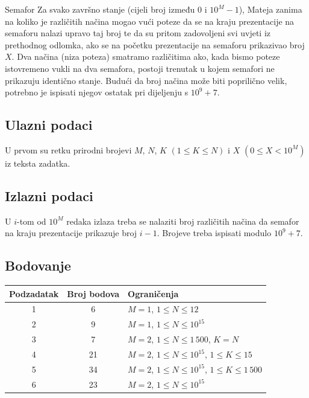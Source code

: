 \begin{statement}[
  problempoints=100,
  timelimit=1 sekunda,
  memorylimit=512 MiB,
]{Semafor}
Za svako završno stanje (cijeli broj između $0$ i $10^M-1$), Mateja zanima na
koliko je različitih načina mogao vući poteze da se na kraju prezentacije na
semaforu nalazi upravo taj broj te da su pritom zadovoljeni svi uvjeti iz
prethodnog odlomka, ako se na početku prezentacije na semaforu prikazivao
broj $X$. Dva načina (niza poteza) smatramo različitima ako, kada bismo
poteze istovremeno vukli na dva semafora, postoji trenutak u kojem semafori
ne prikazuju identično stanje. Budući da broj načina može biti poprilično
velik, potrebno je ispisati njegov ostatak pri dijeljenju s $10^9+7$.
\subsection*{Ulazni podaci}
U prvom su retku prirodni brojevi $M$, $N$, $K$ $(1 \le K \le N)$ i $X$ $(0
\le X < 10^M)$ iz teksta zadatka.

\subsection*{Izlazni podaci}
U $i$-tom od $10^M$ redaka izlaza treba se nalaziti broj različitih načina da
semafor na kraju prezentacije prikazuje broj $i-1$. Brojeve treba ispisati
modulo $10^9 + 7$.

\subsection*{Bodovanje}
{\renewcommand{\arraystretch}{1.4}
  \setlength{\tabcolsep}{6pt}
  \begin{tabular}{ccl}
 Podzadatak & Broj bodova & Ograničenja \\ \midrule
  1 & 6 & $M=1$, $1 \le N \le 12$ \\
  2 & 9 & $M=1$, $1 \le N \le 10^{15}$ \\
  3 & 7 & $M=2$, $1 \le N \le 1\,500$, $K = N$\\
  4 & 21 & $M=2$, $1 \le N \le 10^{15}$, $1 \le K \le 15$ \\
  5 & 34 & $M=2$, $1 \le N \le 10^{15}$, $1 \le K \le 1\,500$ \\
  6 & 23 & $M=2$, $1 \le N \le 10^{15}$ \\
\end{tabular}}


\end{statement}
